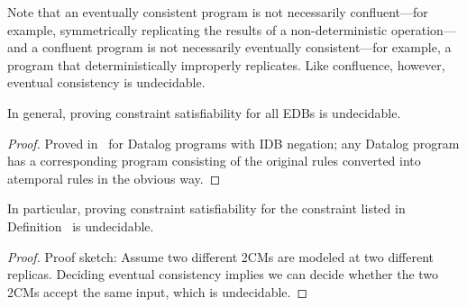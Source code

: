 Note that an eventually consistent program is not necessarily confluent---for example, symmetrically replicating the results of a non-deterministic operation---and a confluent program is not necessarily eventually consistent---for example, a program that deterministically improperly replicates.  Like confluence, however, eventual consistency is undecidable.


\begin{lemma}
In general, proving constraint satisfiability for all EDBs is undecidable.
\end{lemma}
\begin{proof}
Proved in~\cite{qs-datalog} for Datalog programs with IDB negation; any Datalog program has a corresponding \lang program consisting of the original rules converted into atemporal \lang rules in the obvious way.
\end{proof}

\begin{lemma}
In particular, proving constraint satisfiability for the constraint listed in Definition~\label{def:ec} is undecidable.
\end{lemma}
\begin{proof}
Proof sketch: Assume two different 2CMs are modeled at two different replicas.  Deciding eventual consistency implies we can decide whether the two 2CMs accept the same input, which is undecidable.
\end{proof}


%

